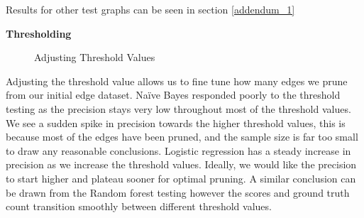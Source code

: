 \documentclass[]{UCD_CS_FYP_Report}
\begin{document}
Results for other test graphs can be seen in section \ref{addendum_1}

\newpage
\textbf{Thresholding}
\begin{figure}[!h]
    \centering
    \hfill
    \hfill
    \caption{Adjusting Threshold Values}
\end{figure}\label{fig:Classifiers vs. Threshold}

\newpage
Adjusting the threshold value allows us to fine tune how many edges we prune from our initial edge dataset. Naïve Bayes responded poorly to the threshold testing as the precision stays very low throughout most of the threshold values. We see a sudden spike in precision towards the higher threshold values, this is because most of the edges have been pruned, and the sample size is far too small to draw any reasonable conclusions. Logistic regression has a steady increase in precision as we increase the threshold values. Ideally, we would like the precision to start higher and plateau sooner for optimal pruning. A similar conclusion can be drawn from the Random forest testing however the scores and ground truth count transition smoothly between different threshold values.
\end{document}

